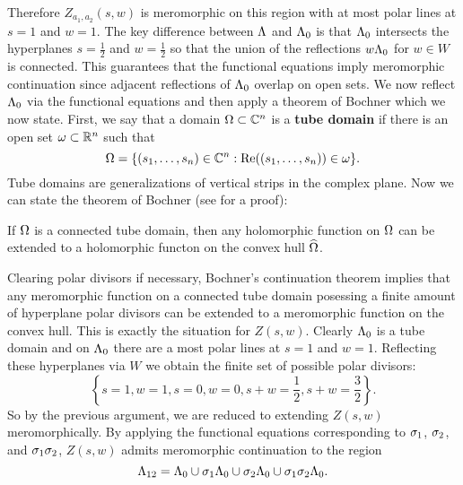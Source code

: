     Therefore $Z_{a_{1},a_{2}}(s,w)$ is meromorphic on this region with at most polar lines at $s = 1$ and $w = 1$. The key difference between $\Lambda$ and $\Lambda_{0}$ is that $\Lambda_{0}$ intersects the hyperplanes $s = \frac{1}{2}$ and $w = \frac{1}{2}$ so that the union of the reflections $w\Lambda_{0}$ for $w \in W$ is connected. This guarantees that the functional equations imply meromorphic continuation since adjacent reflections of $\Lambda_{0}$ overlap on open sets. We now reflect $\Lambda_{0}$ via the functional equations and then apply a theorem of Bochner which we now state. First, we say that a domain $\Omega \subset \mathbb{C}^{n}$ is a \textbf{tube domain} if there is an open set $\omega \subset \mathbb{R}^{n}$ such that
    \[
        \Omega = \{(s_{1},\ldots,s_{n}) \in \mathbb{C}^{n}:\mathrm{Re}((s_{1},\ldots,s_{n})) \in \omega\}.
    \]
    Tube domains are generalizations of vertical strips in the complex plane. Now we can state the theorem of Bochner (see \cite{hormander2000introduction} for a proof):

    \begin{theorem}
        If $\Omega$ is a connected tube domain, then any holomorphic function on $\Omega$ can be extended to a holomorphic functon on the convex hull $\widehat{\Omega}$.
    \end{theorem}

    Clearing polar divisors if necessary, Bochner's continuation theorem implies that any meromorphic function on a connected tube domain posessing a finite amount of hyperplane polar divisors can be extended to a meromorphic function on the convex hull. This is exactly the situation for $Z(s,w)$. Clearly $\Lambda_{0}$ is a tube domain and on $\Lambda_{0}$ there are a most polar lines at $s = 1$ and $w = 1$. Reflecting these hyperplanes via $W$ we obtain the finite set of possible polar divisors:
    \[
        \left\{s = 1, w = 1, s = 0, w = 0, s+w = \frac{1}{2}, s+w = \frac{3}{2}\right\}.
    \]
    So by the previous argument, we are reduced to extending $Z(s,w)$ meromorphically. By applying the functional equations corresponding to $\sigma_{1}$, $\sigma_{2}$, and $\sigma_{1}\sigma_{2}$, $Z(s,w)$ admits meromorphic continuation to the region
    \[
        \Lambda_{12} = \Lambda_{0} \cup \sigma_{1}\Lambda_{0} \cup \sigma_{2}\Lambda_{0} \cup \sigma_{1}\sigma_{2}\Lambda_{0}.
    \]

